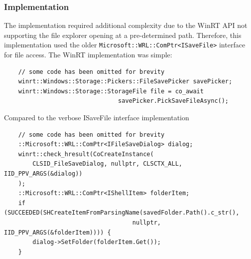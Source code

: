 \subsubsection{Implementation}
The implementation required additional complexity due to the WinRT API not supporting the file explorer opening at a pre-determined path. Therefore, this implementation used the older \texttt{Microsoft::WRL::ComPtr<ISaveFile>} interface for file access. The WinRT implementation was simple:
\begin{verbatim}
    // some code has been omitted for brevity
    winrt::Windows::Storage::Pickers::FileSavePicker savePicker;
    winrt::Windows::Storage::StorageFile file = co_await
                                savePicker.PickSaveFileAsync();
\end{verbatim}  

Compared to the verbose ISaveFile interface implementation
\begin{verbatim}
    // some code has been omitted for brevity
    ::Microsoft::WRL::ComPtr<IFileSaveDialog> dialog;
    winrt::check_hresult(CoCreateInstance(
        CLSID_FileSaveDialog, nullptr, CLSCTX_ALL, IID_PPV_ARGS(&dialog))
    );
    ::Microsoft::WRL::ComPtr<IShellItem> folderItem;
    if (SUCCEEDED(SHCreateItemFromParsingName(savedFolder.Path().c_str(),       
                                    nullptr, IID_PPV_ARGS(&folderItem)))) {
        dialog->SetFolder(folderItem.Get());
    }
\end{verbatim}



